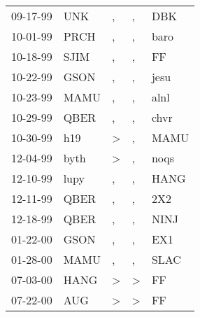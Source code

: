 \begin{supertabular}{p{0.07\textwidth}p{0.06\textwidth}p{0.02\textwidth}p{0.02\textwidth}p{0.06\textwidth}}
 09-17-99\textsuperscript{} &            UNK\textsuperscript{} &                , &             , &   DBK\textsuperscript{} \\
 10-01-99\textsuperscript{} &           PRCH\textsuperscript{} &                , &             , &  baro\textsuperscript{} \\
 10-18-99\textsuperscript{} &           SJIM\textsuperscript{} &                , &             , &    FF\textsuperscript{} \\
 10-22-99\textsuperscript{} &           GSON\textsuperscript{} &                , &             , &  jesu\textsuperscript{} \\
 10-23-99\textsuperscript{} &           MAMU\textsuperscript{} &                , &             , &  alnl\textsuperscript{} \\
 10-29-99\textsuperscript{} &           QBER\textsuperscript{} &                , &             , &  chvr\textsuperscript{} \\
 10-30-99\textsuperscript{} &            h19\textsuperscript{} &     \textgreater &             , &  MAMU\textsuperscript{} \\
 12-04-99\textsuperscript{} &           byth\textsuperscript{} &     \textgreater &             , &  noqs\textsuperscript{} \\
 12-10-99\textsuperscript{} &           lupy\textsuperscript{} &                , &             , &  HANG\textsuperscript{} \\
 12-11-99\textsuperscript{} &           QBER\textsuperscript{} &                , &             , &   2X2\textsuperscript{} \\
 12-18-99\textsuperscript{} &           QBER\textsuperscript{} &                , &             , &  NINJ\textsuperscript{} \\
 01-22-00\textsuperscript{} &           GSON\textsuperscript{} &                , &             , &   EX1\textsuperscript{} \\
 01-28-00\textsuperscript{} &           MAMU\textsuperscript{} &                , &             , &  SLAC\textsuperscript{} \\
 07-03-00\textsuperscript{} &           HANG\textsuperscript{} &     \textgreater &  \textgreater &    FF\textsuperscript{} \\
 07-22-00\textsuperscript{} &            AUG\textsuperscript{} &     \textgreater &  \textgreater &    FF\textsuperscript{} \\

\end{supertabular}
